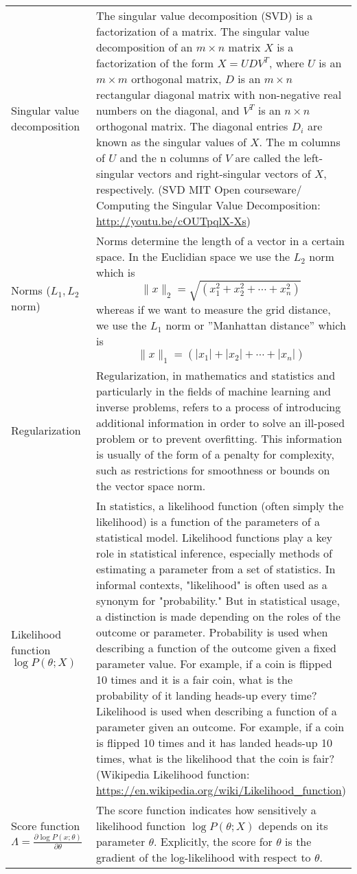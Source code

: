 \documentclass[MachineLearning]{subfiles}
\begin{document}
\begin{longtable}{p{0.3\linewidth} p{0.7\linewidth}}
Singular value decomposition \label{SVD@Glossary} &  The singular value decomposition (SVD) is a factorization of a matrix. The singular value decomposition of an \(m \times n\) matrix \(X\) is a factorization of the form \(X = UDV^T\), where \(U\) is an \(m \times m\) orthogonal matrix, \(D\) is an \(m \times n\) rectangular diagonal matrix with non-negative real numbers on the diagonal, and \(V^T\) is an \(n \times n\) orthogonal matrix. The diagonal entries \(D_i\) are known as the singular values of \(X\). The m columns of \(U\) and the n columns of \(V\) are called the left-singular vectors and right-singular vectors of \(X\), respectively. (SVD MIT Open courseware/ Computing the Singular Value Decomposition: \url{http://youtu.be/cOUTpqlX-Xs})\\
Norms (\(L_1,L_2\) norm) \label{Norms@Glossary}& Norms determine the length of a vector in a certain space. In the Euclidian space we use the \(L_2\) norm which is \[\|x\|_2=\sqrt{\left(x_1^2+x_2^2+\dotsb+x_n^2\right)}\] whereas if we want to measure the grid distance, we use the \(L_1\) norm or ''Manhattan distance'' which is \[ \|x\|_1=\left(|x_1|+|x_2|+\dotsb+|x_n|\right)\]\\
Regularization & Regularization, in mathematics and statistics and particularly in the fields of machine learning and inverse problems, refers to a process of introducing additional information in order to solve an ill-posed problem or to prevent overfitting. This information is usually of the form of a penalty for complexity, such as restrictions for smoothness or bounds on the vector space norm.\\
Likelihood function \(\log P(\theta; X)\) & In statistics, a likelihood function (often simply the likelihood) is a function of the parameters of a statistical model. Likelihood functions play a key role in statistical inference, especially methods of estimating a parameter from a set of statistics. In informal contexts, "likelihood" is often used as a synonym for "probability." But in statistical usage, a distinction is made depending on the roles of the outcome or parameter. Probability is used when describing a function of the outcome given a fixed parameter value. For example, if a coin is flipped 10 times and it is a fair coin, what is the probability of it landing heads-up every time? Likelihood is used when describing a function of a parameter given an outcome. For example, if a coin is flipped 10 times and it has landed heads-up 10 times, what is the likelihood that the coin is fair? (Wikipedia Likelihood function: \url{https://en.wikipedia.org/wiki/Likelihood_function})\\
Score function \(\Lambda = \frac{\partial \log P(x;\theta)}{\partial\theta}\) &  The score function indicates how sensitively a likelihood function \(\log P(\theta; X)\) depends on its parameter \(\theta\). Explicitly, the score for \(\theta\) is the gradient of the log-likelihood with respect to \(\theta\).
\end{longtable}
\end{document}
